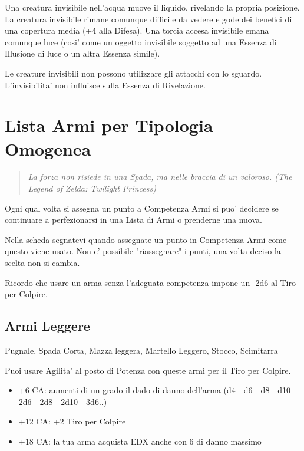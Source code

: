 \documentclass[a4paper,11pt,twoside,openany]{book}
\begin{document}
Una creatura invisibile nell'acqua muove il liquido, rivelando la propria posizione. La creatura invisibile rimane comunque difficile da vedere e gode dei benefici di una copertura media (+4 alla Difesa). Una torcia accesa invisibile emana comunque luce (cosi' come un oggetto invisibile soggetto ad una Essenza di Illusione di luce o un altra Essenza simile).

Le creature invisibili non possono utilizzare gli attacchi con lo sguardo. L'invisibilita' non influisce sulla Essenza di Rivelazione.

\pagebreak

\section{Lista Armi per Tipologia Omogenea}

\label{lista-armi-per-tipologia-omogenea}
\begin{quote}\textit{La forza non risiede in una Spada, ma nelle braccia di un valoroso. (The Legend of Zelda: Twilight Princess)
}\end{quote}

Ogni qual volta si assegna un punto a Competenza Armi si puo' decidere se continuare a perfezionarsi in una Lista di Armi o prenderne una nuova.

Nella scheda segnatevi quando assegnate un punto in Competenza Armi come questo viene usato. Non e' possibile "riassegnare" i punti, una volta deciso la scelta non si cambia.

Ricordo che usare un arma senza l'adeguata competenza impone un -2d6 al Tiro per Colpire.

\subsection{Armi Leggere}Pugnale, Spada Corta, Mazza leggera, Martello Leggero, Stocco, Scimitarra

Puoi usare Agilita' al posto di Potenza con queste armi per il Tiro
per Colpire.

\begin{itemize}
	\item +6 CA: aumenti di un grado il dado di danno dell'arma (d4 - d6 - d8 - d10 - 2d6 - 2d8 - 2d10 - 3d6..)
	
	\item +12 CA: +2 Tiro per Colpire
	
	\item +18 CA: la tua arma acquista EDX anche con 6 di danno massimo 
\end{itemize}
\end{document}
